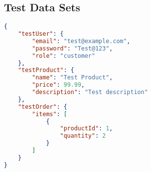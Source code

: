 \subsection{Test Data Sets}
\begin{lstlisting}[language=JSON]
{
    "testUser": {
        "email": "test@example.com",
        "password": "Test@123",
        "role": "customer"
    },
    "testProduct": {
        "name": "Test Product",
        "price": 99.99,
        "description": "Test description"
    },
    "testOrder": {
        "items": [
            {
                "productId": 1,
                "quantity": 2
            }
        ]
    }
}
\end{lstlisting}

